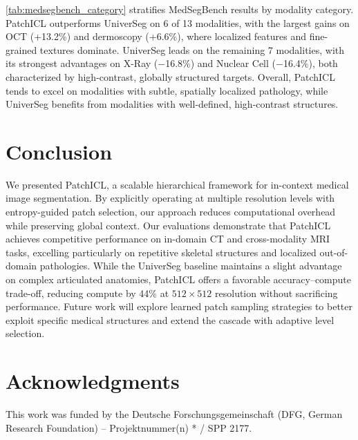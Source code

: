 \documentclass[10pt,twocolumn,letterpaper]{article}
\begin{document}
\cref{tab:medsegbench_category} stratifies MedSegBench results by modality category. PatchICL outperforms UniverSeg on 6 of 13 modalities, with the largest gains on OCT (+13.2\%) and dermoscopy (+6.6\%), where localized features and fine-grained textures dominate. UniverSeg leads on the remaining 7 modalities, with its strongest advantages on X-Ray ($-$16.8\%) and Nuclear Cell ($-$16.4\%), both characterized by high-contrast, globally structured targets. Overall, PatchICL tends to excel on modalities with subtle, spatially localized pathology, while UniverSeg benefits from modalities with well-defined, high-contrast structures.

\section{Conclusion}
\label{sec:conclusion}

We presented PatchICL, a scalable hierarchical framework for in-context medical image segmentation. By explicitly operating at multiple resolution levels with entropy-guided patch selection, our approach reduces computational overhead while preserving global context. Our evaluations demonstrate that PatchICL achieves competitive performance on in-domain CT and cross-modality MRI tasks, excelling particularly on repetitive skeletal structures and localized out-of-domain pathologies. While the UniverSeg baseline maintains a slight advantage on complex articulated anatomies, PatchICL offers a favorable accuracy--compute trade-off, reducing compute by 44\% at $512\times512$ resolution without sacrificing performance. Future work will explore learned patch sampling strategies to better exploit specific medical structures and extend the cascade with adaptive level selection.

\section*{Acknowledgments}
This work was funded by the Deutsche Forschungsgemeinschaft (DFG, German Research Foundation) – Projektnummer(n) * / SPP 2177.

{
    \small
    
    
}
\end{document}
